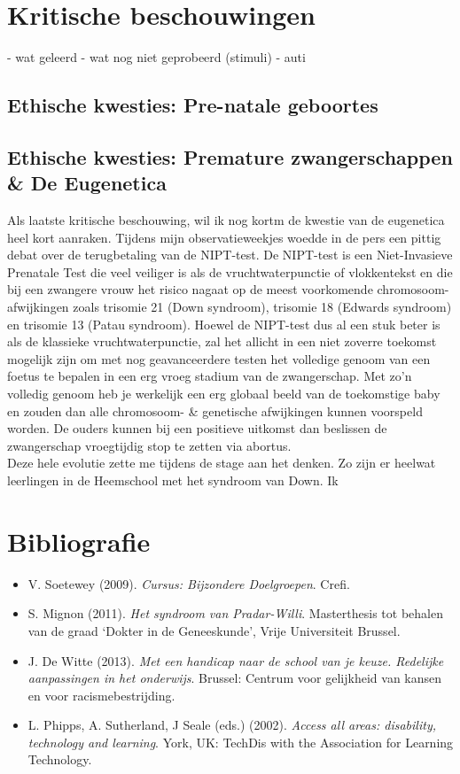 \documentclass[a4paper,11pt]{article}
\theoremstyle{definition}
\begin{document}
\newpage
\section{Kritische beschouwingen}
- wat geleerd
- wat nog niet geprobeerd (stimuli)
- auti
\subsection{Ethische kwesties: Pre-natale geboortes }

\subsection{Ethische kwesties: Premature zwangerschappen \& De Eugenetica}
Als laatste kritische beschouwing, wil ik nog kortm de kwestie van de eugenetica heel 
kort aanraken. Tijdens mijn observatieweekjes woedde in de pers een pittig 
debat over de terugbetaling van de NIPT-test. De NIPT-test is een Niet-Invasieve 
Prenatale Test die veel veiliger is als de vruchtwaterpunctie of vlokkentekst en 
die bij een zwangere vrouw het risico nagaat op de meest voorkomende 
chromosoom-afwijkingen zoals trisomie 21 (Down syndroom), trisomie 18 (Edwards syndroom) en trisomie 13 (Patau 
syndroom). Hoewel de NIPT-test dus al een stuk beter is als de klassieke 
vruchtwaterpunctie, zal het allicht in een niet zoverre toekomst mogelijk zijn 
om met nog geavanceerdere testen het volledige genoom van een foetus te bepalen in een erg vroeg stadium van 
de zwangerschap. Met zo'n volledig genoom heb je werkelijk een erg globaal beeld van de toekomstige baby en zouden dan alle chromosoom- \& 
genetische afwijkingen kunnen voorspeld worden. De ouders kunnen bij een 
positieve uitkomst dan beslissen de zwangerschap vroegtijdig stop te zetten via 
abortus.\\

\noindent Deze hele evolutie zette me tijdens de stage aan het denken. Zo zijn 
er heelwat leerlingen in de Heemschool met het syndroom van Down. Ik 

\newpage
\section{Bibliografie}
\begin{itemize}
  \item V. Soetewey (2009). \emph{Cursus: Bijzondere Doelgroepen}. Crefi. 
  \item S. Mignon (2011). \emph{Het syndroom van Pradar-Willi}. Masterthesis tot behalen van de graad `Dokter in de Geneeskunde', Vrije Universiteit Brussel. 

    \item J. De Witte (2013). \emph{Met een handicap naar de school van je keuze. Redelijke 
    aanpassingen in het onderwijs}. Brussel: Centrum voor gelijkheid van kansen en voor 
    racismebestrijding.
   \item L. Phipps, A. Sutherland, J Seale (eds.) (2002).  \emph{Access all areas: disability, technology and learning}. York, UK: TechDis with the Association for Learning 
   Technology.
   

\end{itemize}
\newpage
\end{document}
